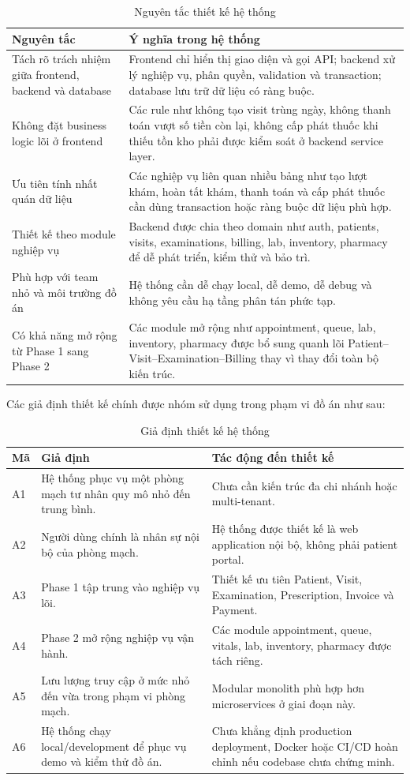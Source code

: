 \begin{longtable}{|p{4.2cm}|p{10.5cm}|}
\caption{Nguyên tắc thiết kế hệ thống}\\
\hline
\textbf{Nguyên tắc} & \textbf{Ý nghĩa trong hệ thống} \\
\hline
Tách rõ trách nhiệm giữa frontend, backend và database & Frontend chỉ hiển thị giao diện và gọi API; backend xử lý nghiệp vụ, phân quyền, validation và transaction; database lưu trữ dữ liệu có ràng buộc. \\
\hline
Không đặt business logic lõi ở frontend & Các rule như không tạo visit trùng ngày, không thanh toán vượt số tiền còn lại, không cấp phát thuốc khi thiếu tồn kho phải được kiểm soát ở backend service layer. \\
\hline
Ưu tiên tính nhất quán dữ liệu & Các nghiệp vụ liên quan nhiều bảng như tạo lượt khám, hoàn tất khám, thanh toán và cấp phát thuốc cần dùng transaction hoặc ràng buộc dữ liệu phù hợp. \\
\hline
Thiết kế theo module nghiệp vụ & Backend được chia theo domain như auth, patients, visits, examinations, billing, lab, inventory, pharmacy để dễ phát triển, kiểm thử và bảo trì. \\
\hline
Phù hợp với team nhỏ và môi trường đồ án & Hệ thống cần dễ chạy local, dễ demo, dễ debug và không yêu cầu hạ tầng phân tán phức tạp. \\
\hline
Có khả năng mở rộng từ Phase 1 sang Phase 2 & Các module mở rộng như appointment, queue, lab, inventory, pharmacy được bổ sung quanh lõi Patient--Visit--Examination--Billing thay vì thay đổi toàn bộ kiến trúc. \\
\hline
\end{longtable}

Các giả định thiết kế chính được nhóm sử dụng trong phạm vi đồ án như sau:

\begin{longtable}{|p{1.2cm}|p{7.2cm}|p{6.2cm}|}
\caption{Giả định thiết kế hệ thống}\\
\hline
\textbf{Mã} & \textbf{Giả định} & \textbf{Tác động đến thiết kế} \\
\hline
A1 & Hệ thống phục vụ một phòng mạch tư nhân quy mô nhỏ đến trung bình. & Chưa cần kiến trúc đa chi nhánh hoặc multi-tenant. \\
\hline
A2 & Người dùng chính là nhân sự nội bộ của phòng mạch. & Hệ thống được thiết kế là web application nội bộ, không phải patient portal. \\
\hline
A3 & Phase 1 tập trung vào nghiệp vụ lõi. & Thiết kế ưu tiên Patient, Visit, Examination, Prescription, Invoice và Payment. \\
\hline
A4 & Phase 2 mở rộng nghiệp vụ vận hành. & Các module appointment, queue, vitals, lab, inventory, pharmacy được tách riêng. \\
\hline
A5 & Lưu lượng truy cập ở mức nhỏ đến vừa trong phạm vi phòng mạch. & Modular monolith phù hợp hơn microservices ở giai đoạn này. \\
\hline
A6 & Hệ thống chạy local/development để phục vụ demo và kiểm thử đồ án. & Chưa khẳng định production deployment, Docker hoặc CI/CD hoàn chỉnh nếu codebase chưa chứng minh. \\
\hline
\end{longtable}


